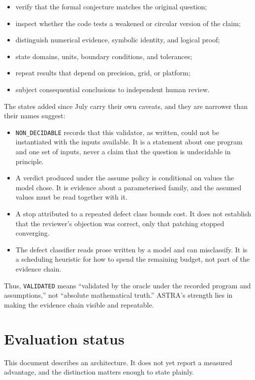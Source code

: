 \documentclass[11pt,a4paper]{article}
\begin{document}
\begin{itemize}
  \item verify that the formal conjecture matches the original question;
  \item inspect whether the code tests a weakened or circular version of the claim;
  \item distinguish numerical evidence, symbolic identity, and logical proof;
  \item state domains, units, boundary conditions, and tolerances;
  \item repeat results that depend on precision, grid, or platform;
  \item subject consequential conclusions to independent human review.
\end{itemize}

The states added since July carry their own caveats, and they are narrower than their names suggest:

\begin{itemize}
  \item \texttt{NON\_DECIDABLE} records that this validator, as written, could not be instantiated with the inputs available. It is a statement about one program and one set of inputs, never a claim that the question is undecidable in principle.
  \item A verdict produced under the assume policy is conditional on values the model chose. It is evidence about a parameterised family, and the assumed values must be read together with it.
  \item A stop attributed to a repeated defect class bounds cost. It does not establish that the reviewer's objection was correct, only that patching stopped converging.
  \item The defect classifier reads prose written by a model and can misclassify. It is a scheduling heuristic for how to spend the remaining budget, not part of the evidence chain.
\end{itemize}

Thus, \texttt{VALIDATED} means ``validated by the oracle under the recorded program and assumptions,'' not ``absolute mathematical truth.'' ASTRA's strength lies in making the evidence chain visible and repeatable.

\section{Evaluation status}

This document describes an architecture. It does not yet report a measured advantage, and the distinction matters enough to state plainly.
\end{document}
